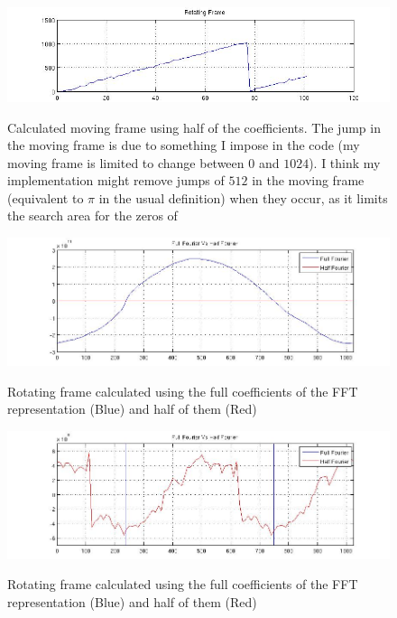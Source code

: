 \begin{description}
\begin{figure}
  \includegraphics[width=1\textwidth]{RotatingFrame}\\
  \caption{Calculated moving frame using half of the coefficients. The jump in the moving frame is due to something I impose in the code (my moving frame is limited to change between $0$ and $1024$). I think my implementation might remove jumps of $512$ in the moving frame (equivalent to $\pi$ in the usual definition) when they occur,  as it limits the search area for the zeros of }\label{RotatingFrame}
\end{figure}

\begin{figure}
  \includegraphics[width=1\textwidth]{FullFourier}\\
  \caption{Rotating frame calculated using the full coefficients of the FFT representation (Blue) and half of them (Red)}\label{FullFourier}
\end{figure}

\begin{figure}
  \includegraphics[width=1\textwidth]{FullFourier2}\\
  \caption{Rotating frame calculated using the full coefficients of the FFT representation (Blue) and half of them (Red)}\label{FullFourier2}
\end{figure}


\end{description}
